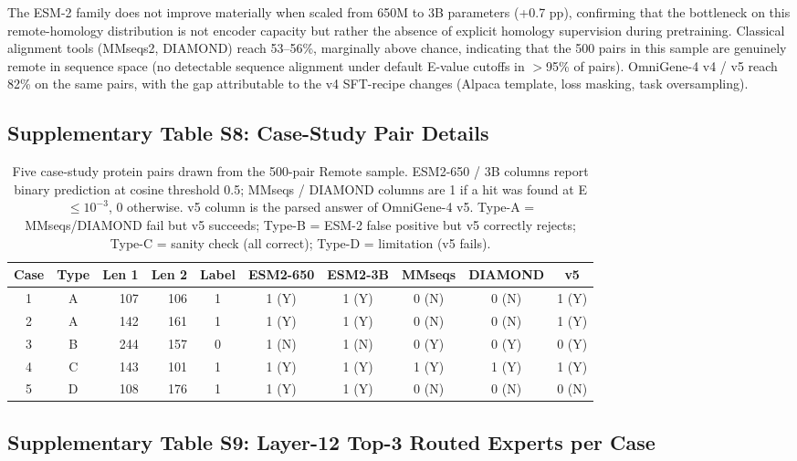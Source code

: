 \documentclass[11pt]{article}
\begin{document}
\noindent The ESM-2 family does not improve materially when scaled from 650M to 3B parameters (+0.7 pp), confirming that the bottleneck on this remote-homology distribution is not encoder capacity but rather the absence of explicit homology supervision during pretraining. Classical alignment tools (MMseqs2, DIAMOND) reach 53--56\%, marginally above chance, indicating that the 500 pairs in this sample are genuinely remote in sequence space (no detectable sequence alignment under default E-value cutoffs in $>$95\% of pairs). OmniGene-4 v4 / v5 reach 82\% on the same pairs, with the gap attributable to the v4 SFT-recipe changes (Alpaca template, loss masking, task oversampling).

\subsection{Supplementary Table S8: Case-Study Pair Details}

\begin{table}[H]
\centering
\small
\caption{Five case-study protein pairs drawn from the 500-pair Remote sample. ESM2-650 / 3B columns report binary prediction at cosine threshold 0.5; MMseqs / DIAMOND columns are 1 if a hit was found at E$\leq 10^{-3}$, 0 otherwise. v5 column is the parsed answer of OmniGene-4 v5. Type-A = MMseqs/DIAMOND fail but v5 succeeds; Type-B = ESM-2 false positive but v5 correctly rejects; Type-C = sanity check (all correct); Type-D = limitation (v5 fails).}
\label{tab:case_studies}
\begin{tabular}{c c r r c c c c c c}
\toprule
\textbf{Case} & \textbf{Type} & \textbf{Len 1} & \textbf{Len 2} & \textbf{Label} & \textbf{ESM2-650} & \textbf{ESM2-3B} & \textbf{MMseqs} & \textbf{DIAMOND} & \textbf{v5} \\
\midrule
1 & A & 107 & 106 & 1 & 1 (Y) & 1 (Y) & 0 (N) & 0 (N) & 1 (Y) \\
2 & A & 142 & 161 & 1 & 1 (Y) & 1 (Y) & 0 (N) & 0 (N) & 1 (Y) \\
3 & B & 244 & 157 & 0 & 1 (N) & 1 (N) & 0 (Y) & 0 (Y) & 0 (Y) \\
4 & C & 143 & 101 & 1 & 1 (Y) & 1 (Y) & 1 (Y) & 1 (Y) & 1 (Y) \\
5 & D & 108 & 176 & 1 & 1 (Y) & 1 (Y) & 0 (N) & 0 (N) & 0 (N) \\
\bottomrule
\end{tabular}
\end{table}

\subsection{Supplementary Table S9: Layer-12 Top-3 Routed Experts per Case}
\end{document}
